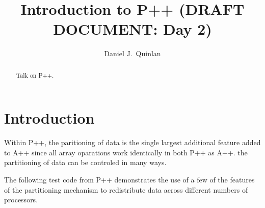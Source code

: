 \documentclass[10pt]{llncs}
\begin{document}
\title{ Introduction to P++ (DRAFT DOCUMENT: Day 2) }
\author{Daniel J.\ Quinlan }

\date{}

\maketitle

\begin{abstract}
   Talk on P++.
\end{abstract}


\section{Introduction}

    Within P++, the paritioning of data is the single largest additional 
feature added to A++ since all array oparations work identically in both P++
as A++. the partitioning of data can be controled in many ways.

The following test code from P++ demonstrates the use of a few of the
features of the partitioning mechanism to redistribute data across
different numbers of processors.
\end{document}
